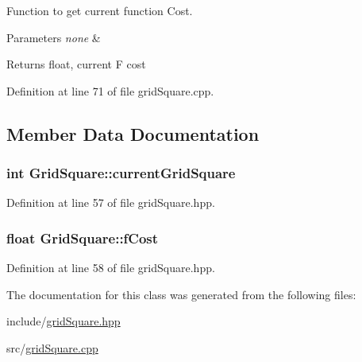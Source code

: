 Function to get current function Cost. 


\begin{DoxyParams}{Parameters}
{\em none} & \\
\hline
\end{DoxyParams}
\begin{DoxyReturn}{Returns}
float, current F cost 
\end{DoxyReturn}


Definition at line 71 of file grid\+Square.\+cpp.



\subsection{Member Data Documentation}
\subsubsection[{\texorpdfstring{current\+Grid\+Square}{currentGridSquare}}]{\setlength{\rightskip}{0pt plus 5cm}int Grid\+Square\+::current\+Grid\+Square}\hypertarget{class_grid_square_af62396d0127126d7f95a81f81f4bc833}{}\label{class_grid_square_af62396d0127126d7f95a81f81f4bc833}


Definition at line 57 of file grid\+Square.\+hpp.

\subsubsection[{\texorpdfstring{f\+Cost}{fCost}}]{\setlength{\rightskip}{0pt plus 5cm}float Grid\+Square\+::f\+Cost}\hypertarget{class_grid_square_a9d04f5503abd3663e7496dc6c3a702c0}{}\label{class_grid_square_a9d04f5503abd3663e7496dc6c3a702c0}


Definition at line 58 of file grid\+Square.\+hpp.



The documentation for this class was generated from the following files\+:\begin{DoxyCompactItemize}
\item 
include/\hyperlink{grid_square_8hpp}{grid\+Square.\+hpp}\item 
src/\hyperlink{grid_square_8cpp}{grid\+Square.\+cpp}\end{DoxyCompactItemize}
